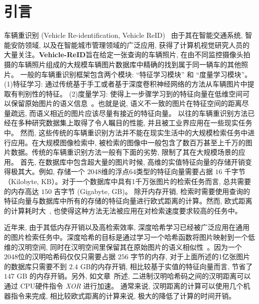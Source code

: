 \section{引言}
车辆重识别 (Vehicle Re-identification, Vehicle ReID)~\cite{liu2016deep, liu2017beyond, yan2017exploiting, guo2018learning, lou2019embedding, meng2020parsing} 由于其在智能交通系统, 智能安防领域, 以及在智能城市管理领域的广泛应用, 获得了计算机视觉研究人员的大量关注。\textbf{Vehicle-ReID}旨在给定一张查询的车辆照片, 在由不同监控摄像头拍摄的车辆照片组成的大规模车辆图片数据库中精确的找到属于同一辆车的其他照片。 一般的车辆重识别框架包含两个模块: ``特征学习模块'' 和 ``度量学习模块''。 (1)特征学习: 通过传统基于手工或者基于深度卷积神经网络的方法从车辆图片中提取有判别性的特征。 (2)度量学习: 使得上一步骤学习到的特征向量在低维空间可以保留原始图片的语义信息~\cite{chu2019vehicle}。也就是说, 语义不一致的图片在特征空间的距离尽量疏远, 而语义相近的图片应该尽量有接近的特征向量。 以往的车辆重识别方法已经在多种研究数据集上取得了令人瞩目的性能, 并且被工业界应用在一些现实任务中。 然而, 这些传统的车辆重识别方法并不能在现实生活中的大规模检索任务中进行应用。在大规模图像检索中, 被检索的图像中一般包含了数百万甚至上千万的图片数据。传统的车辆重识别方法一般有下面的劣势, 限制了其在大规模场景的应用。 首先, 在数据库中包含超大量的图片时候, 高维的实值特征向量的存储开销变得极其大。例如, 存储一个 $2048$维的浮点$64$类型的特征向量需要占据 $16$ 千字节（Kilobyte, KB）。对于一个数据库中具有1千万张图片的检索任务而言, 总共需要的内存高达 $150$ 吉字节 (Gigabyte, GB)。 除开内存开销, 检索时需要使用查询的特征向量与数据库中所有的存储的特征向量进行欧式距离的计算。然而, 欧式距离的计算耗时大~\cite{lin2015deep}, 也使得这种方法无法被应用在对检索速度要求较高的任务中。\par
近年来, 由于其低内存开销以及高检索效率, 深度哈希学习已经被广泛应用在通用的图片检索任务中。深度哈希的目标是通过学习一个哈希函数将图片映射到一个低维的汉明空间, 同时在汉明空间里保留其在原始图片的语义相似性~\cite{lin2015deep, cakir2019hashing, cao2016correlation, cao2017hashnet}。因为一个 $2048$位的汉明哈希码仅仅只需要占据 $256$ 字节的内存, 对于上面所述的1亿张图片的数据库只需要不到 $2.4$ GB的内存开销, 相比较基于实值的特征向量而言, 节省了 $147$ GB 的内存开销。另外, 如文章~\cite{ong2016improved}所述, 二进制汉明哈希码之间的汉明距离可以通过 CPU硬件指令 \textit{XOR} 进行加速。 通常来说, 汉明距离的计算可以使用几个机器指令来完成, 相比较欧式距离的计算来说, 极大的降低了计算的时间开销。 \par
